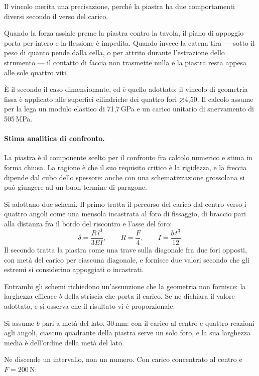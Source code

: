 Il vincolo merita una precisazione, perché la piastra ha due comportamenti
diversi secondo il verso del carico.

Quando la forza assiale preme la piastra contro la tavola, il piano di appoggio
porta per intero e la flessione è impedita. Quando invece la catena tira ---
sotto il peso di quanto pende dalla cella, o per attrito durante l'estrazione
dello strumento --- il contatto di faccia non trasmette nulla e la piastra resta
appesa alle sole quattro viti.

È il secondo il caso dimensionante, ed è quello adottato: il vincolo di
geometria fissa è applicato alle superfici cilindriche dei quattro fori
$\varnothing$4,50. Il calcolo assume per la lega un modulo elastico di
71,7\,GPa e un carico unitario di snervamento di 505\,MPa.

\paragraph{Stima analitica di confronto.}
La piastra è il componente scelto per il confronto fra calcolo numerico e stima
in forma chiusa. La ragione è che il suo requisito critico è la rigidezza, e la
freccia dipende dal cubo dello spessore: anche con una schematizzazione grossolana
si può giungere ad un buon termine di paragone.

Si adottano due schemi. Il primo tratta il percorso del carico dal centro verso
i quattro angoli come una mensola incastrata al foro di fissaggio, di braccio
pari alla distanza fra il bordo del riscontro e l'asse del foro:
\begin{equation}
    \delta = \frac{R \, l^3}{3 E I} , \qquad
    R = \frac{F}{4} , \qquad
    I = \frac{b \, t^3}{12} .
\end{equation}
Il secondo tratta la piastra come una trave sulla diagonale fra due fori
opposti, con metà del carico per ciascuna diagonale, e fornisce due valori
secondo che gli estremi si considerino appoggiati o incastrati.

Entrambi gli schemi richiedono un'assunzione che la geometria non fornisce: la
larghezza efficace $b$ della striscia che porta il carico. Se ne dichiara il
valore adottato, e si osserva che il risultato vi è proporzionale.

Si assume $b$ pari a metà del lato, 30\,mm: con il carico al centro e quattro
reazioni agli angoli, ciascun quadrante della piastra serve un solo foro, e la
sua larghezza media è dell'ordine della metà del lato.

Ne discende un intervallo, non un numero. Con carico concentrato al centro e
$F = 200$\,N:

